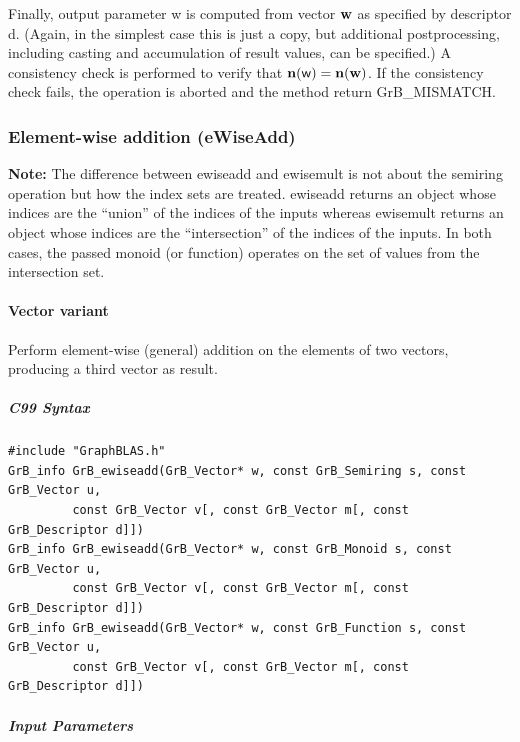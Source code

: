 \documentclass[11pt]{extarticle}
\begin{document}
Finally, output parameter {\sf w} is computed from vector ${\bf w}$
as specified by descriptor {\sf d}. (Again, in the simplest case this
is just a copy, but additional postprocessing, including casting and
accumulation of result values, can be specified.)  A consistency check is
performed to verify that $\bold{n}({\sf w}) = \bold{n}({\bf w})$. If
the consistency check fails, the operation is aborted and the method
return {\sf GrB\_MISMATCH}.

\subsubsection{Element-wise addition ({\sf eWiseAdd})}

{\bf Note:} The difference between {\sf ewiseadd} and {\sf ewisemult} is not about the semiring operation but how the index sets are treated.
 {\sf ewiseadd} returns an object whose indices are the ``union'' of the indices of the inputs whereas  
 {\sf ewisemult} returns an object whose indices are the ``intersection'' of the indices of the inputs. In both cases, the passed monoid (or function) operates on the 
 set of values from the intersection set. 

\paragraph{Vector variant}

Perform element-wise (general) addition on the elements of two vectors,
producing a third vector as result.

\subparagraph{C99 Syntax}

\begin{verbatim}
#include "GraphBLAS.h"
GrB_info GrB_ewiseadd(GrB_Vector* w, const GrB_Semiring s, const GrB_Vector u,
         const GrB_Vector v[, const GrB_Vector m[, const GrB_Descriptor d]])
GrB_info GrB_ewiseadd(GrB_Vector* w, const GrB_Monoid s, const GrB_Vector u,
         const GrB_Vector v[, const GrB_Vector m[, const GrB_Descriptor d]])
GrB_info GrB_ewiseadd(GrB_Vector* w, const GrB_Function s, const GrB_Vector u,
         const GrB_Vector v[, const GrB_Vector m[, const GrB_Descriptor d]])
\end{verbatim}

\subparagraph{Input Parameters}
\end{document}
